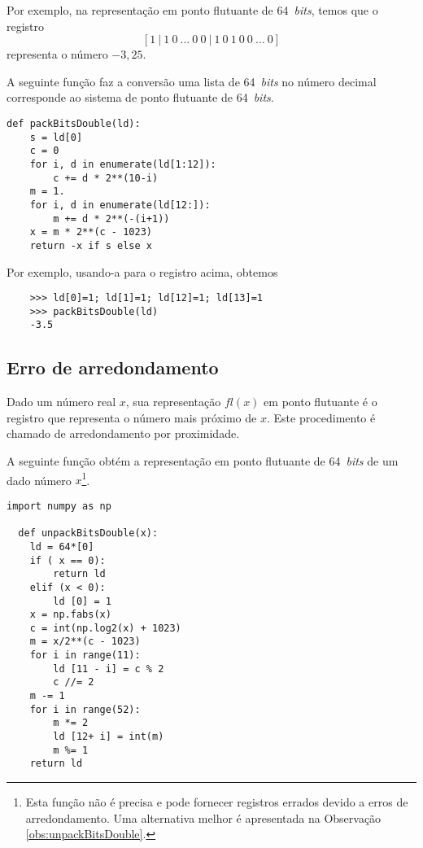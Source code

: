 \begin{ex}
  Por exemplo, na representação em ponto flutuante de 64~{\it bits}, temos que o registro
  \begin{equation}\label{eq:regfloat64}
    [1 ~ | ~ 1 ~ 0 ~ \ldots ~ 0 ~ 0 ~ | ~ 1 ~ 0 ~ 1 ~ 0 ~ 0 ~ \ldots ~ 0]
  \end{equation}
  representa o número $-3,25$.

  A seguinte função faz a conversão  uma lista de 64~{\it bits} no número decimal corresponde ao sistema de ponto flutuante de 64~{\it bits}.
  \begin{lstlisting}[caption=packBitsDouble.py, label=cod:packBitsDouble]
    def packBitsDouble(ld):
    s = ld[0]
    c = 0
    for i, d in enumerate(ld[1:12]):
        c += d * 2**(10-i)
    m = 1.
    for i, d in enumerate(ld[12:]):
        m += d * 2**(-(i+1))
    x = m * 2**(c - 1023)
    return -x if s else x
  \end{lstlisting}
  Por exemplo, usando-a para o registro acima, obtemos
  \begin{lstlisting}
    >>> ld[0]=1; ld[1]=1; ld[12]=1; ld[13]=1
    >>> packBitsDouble(ld)
    -3.5
  \end{lstlisting}
\end{ex}

\subsection{Erro de arredondamento}

Dado um número real $x$, sua representação $fl(x)$ em ponto flutuante é o registro que representa o número mais próximo de $x$. Este procedimento é chamado de arredondamento por proximidade.

A seguinte função obtém a representação em ponto flutuante de 64~{\it bits} de um dado número $x$\footnote{Esta função não é precisa e pode fornecer registros errados devido a erros de arredondamento. Uma alternativa melhor é apresentada na Observação \ref{obs:unpackBitsDouble}.}.
\begin{lstlisting}[caption=unpackBitsDouble.py, label=cod:unpackBitsDouble]
  import numpy as np

  def unpackBitsDouble(x):
    ld = 64*[0]
    if ( x == 0):
        return ld
    elif (x < 0):
        ld [0] = 1
    x = np.fabs(x)
    c = int(np.log2(x) + 1023)
    m = x/2**(c - 1023)
    for i in range(11):
        ld [11 - i] = c % 2
        c //= 2
    m -= 1
    for i in range(52):
        m *= 2
        ld [12+ i] = int(m)
        m %= 1
    return ld
  \end{lstlisting}

